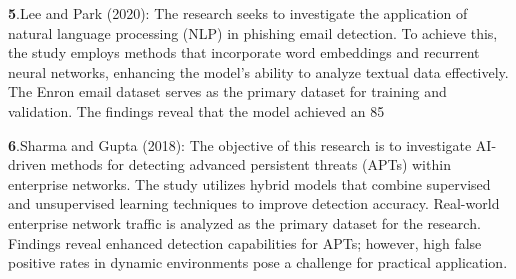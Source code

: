 \documentclass[oneside,a4paper,12pt]{report}
\begin{document}
\textbf5.Lee and Park (2020):
The research seeks to investigate the application of natural language processing (NLP) in phishing email detection. To achieve this, the study employs methods that incorporate word embeddings and recurrent neural networks, enhancing the model's ability to analyze textual data effectively. The Enron email dataset serves as the primary dataset for training and validation. The findings reveal that the model achieved an 85%

\textbf6.Sharma and Gupta (2018):
The objective of this research is to investigate AI-driven methods for detecting advanced persistent threats (APTs) within enterprise networks. The study utilizes hybrid models that combine supervised and unsupervised learning techniques to improve detection accuracy. Real-world enterprise network traffic is analyzed as the primary dataset for the research. Findings reveal enhanced detection capabilities for APTs; however, high false positive rates in dynamic environments pose a challenge for practical application.\newline
\pageborder
\renewcommand{\arraystretch}{1.5} %
\setlength{\extrarowheight}{2pt} %
\end{document}
